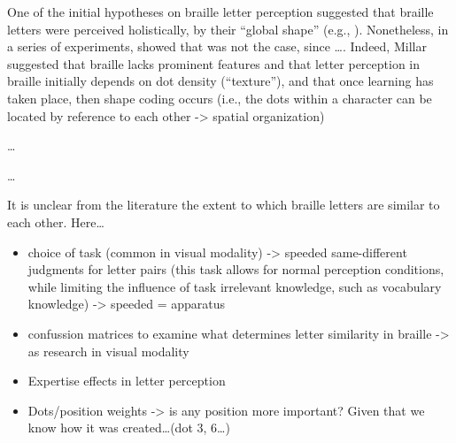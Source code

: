 \documentclass[english,man]{apa7}
\begin{document}
One of the initial hypotheses on braille letter perception suggested that braille letters were perceived holistically, by their \enquote{global shape} (e.g., {\colorbox{blue}{\sffamily\scriptsize\bfseries\color{white}{abl}}}{\sffamily\small\itshape\color{blue}{CITE: Nolan \& Kederis, 1969}}). Nonetheless, in a series of experiments, {\colorbox{blue}{\sffamily\scriptsize\bfseries\color{white}{abl}}}{\sffamily\small\itshape\color{blue}{CITE: Millar 1977 a, b, 1985, see also 2003...}} showed that was not the case, since \ldots{}{\colorbox{blue}{\sffamily\scriptsize\bfseries\color{white}{abl}}}{\sffamily\small\itshape\color{blue}{explain results: high accurafcy in same/different but not able to recall/drawing...}}. Indeed, Millar suggested that braille lacks prominent features and that letter perception in braille initially depends on dot density (\enquote{texture}), and that once learning has taken place, then shape coding occurs (i.e., the dots within a character can be located by reference to each other -\textgreater{} spatial organization)

\ldots{} {\colorbox{blue}{\sffamily\scriptsize\bfseries\color{white}{abl}}}{\sffamily\small\itshape\color{blue}{link to what we're doing -- even though "braille letters are bound to be similar to each other"...are all of them equally similar?}}

\ldots{}{\colorbox{darkyellow}{\sffamily\scriptsize\bfseries\color{white}{pga}}}{\sffamily\small\itshape{}}

It is unclear from the literature the extent to which braille letters are similar to each other. Here\ldots{}

{\colorbox{darkyellow}{\sffamily\scriptsize\bfseries\color{white}{pga}}}{\sffamily\small\itshape\color{darkyellow}{Brief intro on what we are doing}}

\begin{itemize}
\item
  choice of task (common in visual modality) -\textgreater{} speeded same-different judgments for letter pairs (this task allows for normal perception conditions, while limiting the influence of task irrelevant knowledge, such as vocabulary knowledge) -\textgreater{} speeded = apparatus
\item
  confussion matrices to examine what determines letter similarity in braille -\textgreater{} as research in visual modality
\item
  Expertise effects in letter perception
\item
  Dots/position weights -\textgreater{} is any position more important? Given that we know how it was created\ldots{}(dot 3, 6\ldots{})
\end{itemize}
\end{document}
